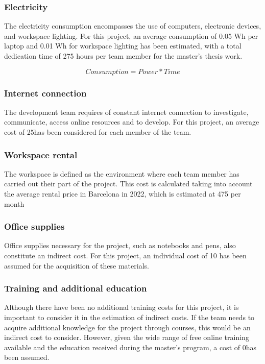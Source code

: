 \documentclass[../memory.tex]{subfiles}
\begin{document}
\subsubsection{Electricity}
The electricity consumption encompasses the use of computers, electronic
devices, and workspace lighting. For this project, an average consumption of
0.05 Wh per laptop and 0.01 Wh for workspace lighting has been estimated, with a
total dedication time of 275 hours per team member for the master's thesis work.
\begin{center}
	\[ Consumption = Power * Time \]
\end{center}
\subsubsection{Internet connection}
The development team requires of constant internet connection to investigate,
communicate, access online resources and to develop. For this project, an
average cost of 25\texteuro has been considered for each member of the
team\cite{internet-cost}.
\subsubsection{Workspace rental}
The workspace is defined as the environment where each team member has carried
out their part of the project. This cost is calculated taking into account the
average rental price in Barcelona in 2022, which is estimated at 475\texteuro
per month\cite{workspace-cost}
\subsubsection{Office supplies}
Office supplies necessary for the project, such as notebooks and pens, also
constitute an indirect cost. For this project, an individual cost of 10\texteuro
has been assumed for the acquisition of these materials.
\subsubsection{Training and additional education}
Although there have been no additional training costs for this project, it is
important to consider it in the estimation of indirect costs. If the team needs
to acquire additional knowledge for the project through courses, this would be
an indirect cost to consider. However, given the wide range of free online
training available and the education received during the master's program, a
cost of 0\texteuro has been assumed.
\end{document}
